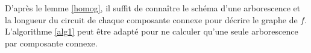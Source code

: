 \begin{csq}
D'apr\`es le lemme \ref{homog}, il suffit de conna\^itre le sch\'ema d'une arborescence et la longueur du circuit de chaque composante connexe pour d\'ecrire le graphe de $f$. L'algorithme \ref{alg1} peut \^etre adapt\'e pour ne calculer qu'une seule arborescence par composante connexe.
\end{csq}